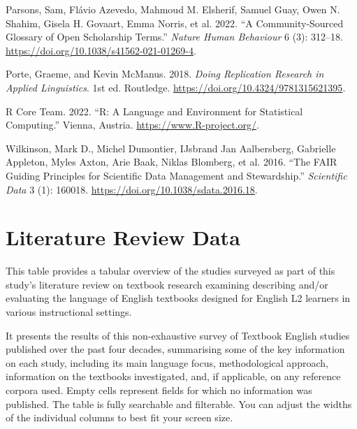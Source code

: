 \documentclass[
  letterpaper,
  DIV=11,
  numbers=noendperiod]{scrreprt}
\newlength{\cslhangindent}
\newenvironment{CSLReferences}[2] %
 {\begin{list}{}{%
  \setlength{\itemindent}{0pt}
  \setlength{\leftmargin}{0pt}
  \setlength{\parsep}{0pt}
  \ifodd #1
   \setlength{\leftmargin}{\cslhangindent}
   \setlength{\itemindent}{-1\cslhangindent}
  \fi
  \setlength{\itemsep}{#2\baselineskip}}}
 {\end{list}}
\begin{document}
\begin{CSLReferences}{1}{0}
Parsons, Sam, Flávio Azevedo, Mahmoud M. Elsherif, Samuel Guay, Owen N.
Shahim, Gisela H. Govaart, Emma Norris, et al. 2022. {``A
Community-Sourced Glossary of Open Scholarship Terms.''} \emph{Nature
Human Behaviour} 6 (3): 312--18.
\url{https://doi.org/10.1038/s41562-021-01269-4}.

Porte, Graeme, and Kevin McManus. 2018. \emph{Doing Replication Research
in Applied Linguistics}. 1st ed. Routledge.
\url{https://doi.org/10.4324/9781315621395}.

R Core Team. 2022. {``R: A Language and Environment for Statistical
Computing.''} Vienna, Austria. \url{https://www.R-project.org/}.

Wilkinson, Mark D., Michel Dumontier, IJsbrand Jan Aalbersberg,
Gabrielle Appleton, Myles Axton, Arie Baak, Niklas Blomberg, et al.
2016. {``The FAIR Guiding Principles for Scientific Data Management and
Stewardship.''} \emph{Scientific Data} 3 (1): 160018.
\url{https://doi.org/10.1038/sdata.2016.18}.

\end{CSLReferences}

\cleardoublepage
{}
{}
\appendix

\chapter{Literature Review Data}\label{literature-review-data}

This table provides a tabular overview of the studies surveyed as part
of this study's literature review on textbook research examining
describing and/or evaluating the language of English textbooks designed
for English L2 learners in various instructional settings.

It presents the results of this non-exhaustive survey of Textbook
English studies published over the past four decades, summarising some
of the key information on each study, including its main language focus,
methodological approach, information on the textbooks investigated, and,
if applicable, on any reference corpora used. Empty cells represent
fields for which no information was published. The table is fully
searchable and filterable. You can adjust the widths of the individual
columns to best fit your screen size.
\end{document}
